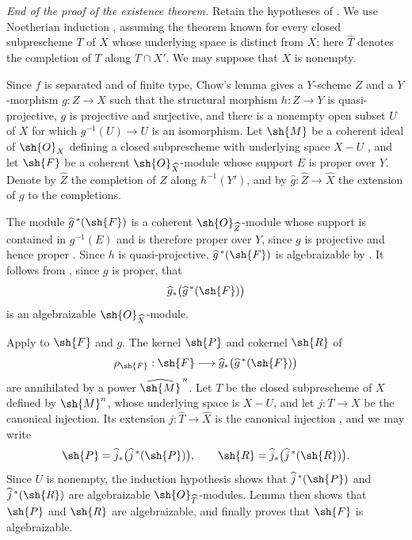 \begin{env}[5.3.5]
\label{III.5.3.5}
\emph{End of the proof of the existence theorem.}
Retain the hypotheses of .  We use Noetherian
induction , assuming the theorem known for every
closed subprescheme $T$ of $X$ whose underlying space is distinct
from $X$; here $\widehat{T}$ denotes the completion of $T$ along
$T\cap X'$.  We may suppose that $X$ is nonempty.

Since $f$ is separated and of finite type, Chow's lemma
 gives a $Y$-scheme $Z$ and a $Y$-morphism
$g:Z\to X$ such that the structural morphism $h:Z\to Y$ is
quasi-projective, $g$ is projective and surjective, and there is a
nonempty open subset $U$ of $X$ for which
$g^{-1}(U)\to U$ is an isomorphism.  Let $\sh{M}$ be a coherent
ideal of $\sh{O}_X$ defining a closed subprescheme with underlying
space $X-U$ , and let $\sh{F}$ be a coherent
$\sh{O}_{\widehat{X}}$-module whose support $E$ is proper over $Y$.
Denote by $\widehat{Z}$ the completion of $Z$ along
$h^{-1}(Y')$, and by
$\widehat{g}:\widehat{Z}\to\widehat{X}$ the extension of $g$ to
the completions.

The module $\widehat{g}^{\,*}(\sh{F})$ is a coherent
$\sh{O}_{\widehat{Z}}$-module whose support is contained in
$g^{-1}(E)$ and is therefore proper over $Y$, since $g$ is
projective and hence proper .  Since $h$ is
quasi-projective, $\widehat{g}^{\,*}(\sh{F})$ is algebraizable by
.
It follows from , since $g$ is proper, that
\[
  \widehat{g}_*
  \bigl(\widehat{g}^{\,*}(\sh{F})\bigr)
\]
is an algebraizable $\sh{O}_{\widehat{X}}$-module.

Apply  to $\sh{F}$ and $g$.  The kernel $\sh{P}$
and cokernel $\sh{R}$ of
\[
  \rho_{\sh{F}}:
  \sh{F}\longrightarrow
  \widehat{g}_*\bigl(\widehat{g}^{\,*}(\sh{F})\bigr)
\]
are annihilated by a power $\widehat{\sh{M}}^{\,n}$.  Let $T$ be
the closed subprescheme of $X$ defined by $\sh{M}^n$, whose
underlying space is $X-U$, and let $j:T\to X$ be the canonical
injection.  Its extension
$\widehat{j}:\widehat{T}\to\widehat{X}$ is the canonical injection
, and we may write
\[
  \sh{P}=
  \widehat{j}_*\bigl(\widehat{j}^{\,*}(\sh{P})\bigr),
  \qquad
  \sh{R}=
  \widehat{j}_*\bigl(\widehat{j}^{\,*}(\sh{R})\bigr).
\]
Since $U$ is nonempty, the induction hypothesis shows that
$\widehat{j}^{\,*}(\sh{P})$ and
$\widehat{j}^{\,*}(\sh{R})$ are algebraizable
$\sh{O}_{\widehat{T}}$-modules.  Lemma  then shows
that $\sh{P}$ and $\sh{R}$ are algebraizable, and
 finally proves that $\sh{F}$ is algebraizable.
\end{env}


